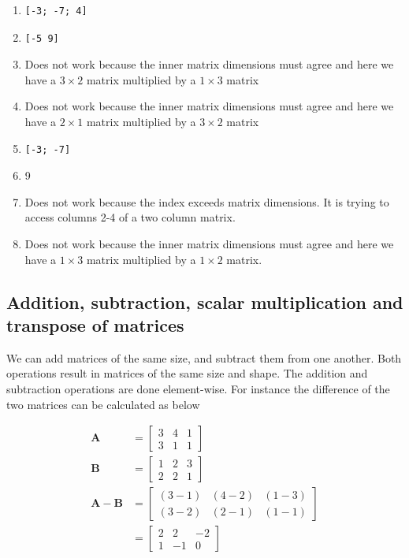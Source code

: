 \begin{sol}
\begin{enumerate}
    \item \begin{verbatim}[-3; -7; 4]\end{verbatim}
    \item \begin{verbatim}[-5 9]\end{verbatim}
    \item Does not work because the inner matrix dimensions must agree and here we have a $3\times 2$ matrix multiplied by a $1\times 3$ matrix
    \item Does not work because the inner matrix dimensions must agree and here we have a $2\times 1$ matrix multiplied by a $3\times 2$ matrix
    \item \begin{verbatim}[-3; -7]\end{verbatim}
    \item 9
    \item Does not work because the index exceeds matrix dimensions. It is trying to access columns 2-4 of a two column matrix.
    \item Does not work because the inner matrix dimensions must agree and here we have a $1\times 3$ matrix multiplied by a $1\times 2$ matrix.
    \end{enumerate}
\end{sol}

\subsection{Addition, subtraction, scalar multiplication and transpose of matrices}

We can add matrices of the same size, and subtract them from one another. Both operations result in matrices of the same size and shape.  The addition and subtraction operations are done element-wise. For instance the difference of the two matrices can be calculated as below

\begin{align}
\mathbf{A} &= \begin{bmatrix}3 & 4 & 1 \\ 3 & 1 & 1 \end{bmatrix}\\
\mathbf{B} &= \begin{bmatrix}
1 & 2 & 3 \\ 2 & 2 & 1
\end{bmatrix}\\
\mathbf{A} - \mathbf{B} &= \begin{bmatrix}
(3 - 1) & (4-2) & (1-3) \\ (3-2) & (2-1) & (1-1)
\end{bmatrix} \\
&= \begin{bmatrix}
2 & 2 & -2 \\ 1 & -1 & 0
\end{bmatrix}
\end{align}

